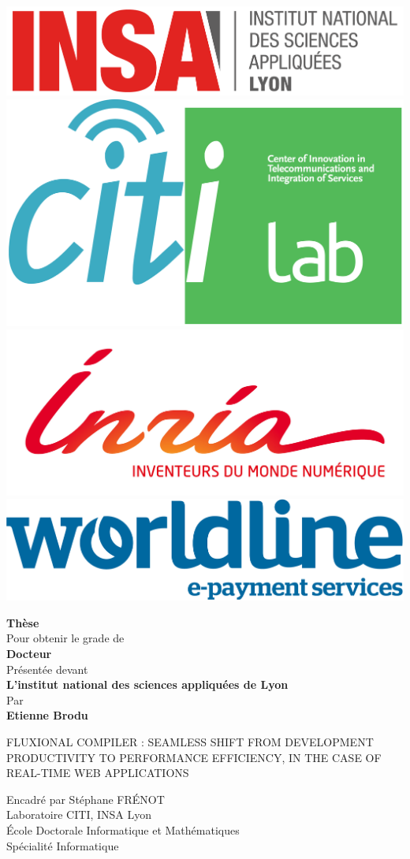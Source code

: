 \begin{center}
\parbox{\linewidth}{%
  \includegraphics[height=.4in]{../resources/insa}%
  \hfill
  \includegraphics[height=.4in]{../resources/citi}%
  \hfill
  \includegraphics[height=.4in]{../resources/inria}%
  \hfill
  \includegraphics[height=.4in]{../resources/worldline}%
}%
\vfill
{\large\textbf{Thèse}}\\[1em]

Pour obtenir le grade de\\
{\large\textbf{Docteur}}\\[1em]

Présentée devant\\
{\large\textbf{L’institut national des sciences appliquées de Lyon}}\\[1em]

Par\\
{\large\textbf{Etienne Brodu}}\\[1em]

\parbox{\linewidth}{%
\vspace{10pt}
\titleline%
\vspace{10pt}
\secfont\fontsize{20pt}{25pt}\selectfont%
\MakeUppercase{Fluxional compiler : seamless shift from development productivity to performance efficiency, in the case of real-time web applications}%
\vspace{10pt}%
\titleline\color{black}%
\vspace{10pt}
}

Encadré par Stéphane FRÉNOT\\
Laboratoire CITI, INSA Lyon\\
École Doctorale Informatique et Mathématiques\\
Spécialité Informatique\\[1em]


\end{center}
